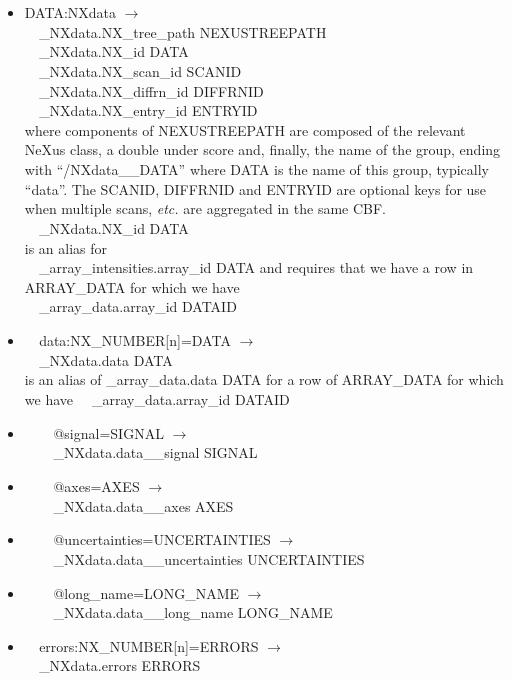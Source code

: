 \documentclass[11pt]{article}
\begin{document}
{{\begin{itemize}
\item{DATA:NXdata $\rightarrow$\\
\verb|  |\_NXdata.NX\_tree\_path    NEXUSTREEPATH \\
\verb|  |\_NXdata.NX\_id            DATA\\
\verb|  |\_NXdata.NX\_scan\_id      SCANID \\
\verb|  |\_NXdata.NX\_diffrn\_id    DIFFRNID \\
\verb|  |\_NXdata.NX\_entry\_id     ENTRYID \\
where components of NEXUSTREEPATH are composed of the
relevant NeXus class, a double under score and, finally, the
name of the group, ending with ``/NXdata\_\_DATA''
where DATA is the name of this group, typically ``data''.
The SCANID, DIFFRNID and ENTRYID are optional keys for use
when multiple scans, {\it etc.} are aggregated in the same CBF.\\
\verb|  |\_NXdata.NX\_id            DATA\\
is an alias for \\
\verb|  |\_array\_intensities.array\_id  DATA
and requires that we have a row in ARRAY\_DATA for which we have \\
\verb|  |\_array\_data.array\_id DATAID}

\item{\verb|  |data:NX\_NUMBER[n]=DATA $\rightarrow$\\
\verb|  |\_NXdata.data DATA \\
is an alias of \_array\_data.data DATA
for a row of ARRAY\_DATA for which we have
\verb|  |\_array\_data.array\_id DATAID}

\item{\verb|    |@signal=SIGNAL $\rightarrow$\\
\verb|    |\_NXdata.data\_\_signal SIGNAL}

\item{\verb|    |@axes=AXES $\rightarrow$\\
\verb|    |\_NXdata.data\_\_axes AXES}

\item{\verb|    |@uncertainties=UNCERTAINTIES $\rightarrow$\\
\verb|    |\_NXdata.data\_\_uncertainties UNCERTAINTIES}

\item{\verb|    |@long\_name=LONG\_NAME $\rightarrow$\\
\verb|    |\_NXdata.data\_\_long\_name LONG\_NAME}

\item{\verb|  |errors:NX\_NUMBER[n]=ERRORS $\rightarrow$\\
\verb|  |\_NXdata.errors ERRORS}


\end{itemize}}}
\end{document}
